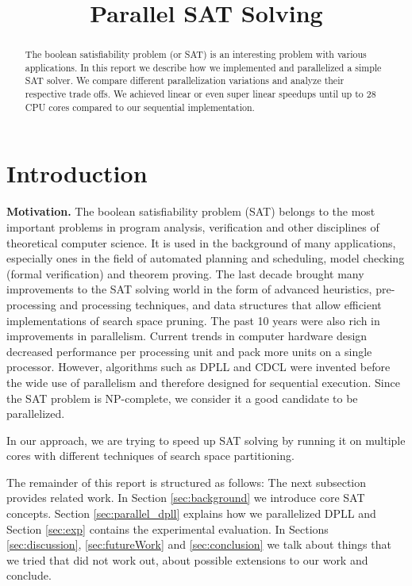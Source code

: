 \documentclass[letterpaper]{article}
\title{Parallel SAT Solving}
\newcommand{\mypar}[1]{{\bf #1.}}
\begin{document}
%
\maketitle
%

\begin{abstract}
The boolean satisfiability problem (or SAT) is an interesting problem with various applications.
In this report we describe how we implemented and parallelized a simple SAT solver.
We compare different parallelization variations and analyze their respective trade offs.
We achieved linear or even super linear speedups until up to 28 CPU cores compared to our sequential implementation.
\end{abstract}

\section{Introduction}\label{sec:intro}

\mypar{Motivation}
The boolean satisfiability problem (SAT) belongs to the most important problems in program analysis, verification and other disciplines of theoretical computer science.
It is used in the background of many applications, especially ones in the field of automated planning and scheduling, model checking (formal verification) and theorem proving.
The last decade brought many improvements to the SAT solving world in the form of advanced heuristics, pre-processing and processing techniques, and data structures that allow efficient implementations of search space pruning.
The past 10 years were also rich in improvements in parallelism.
Current trends in computer hardware design decreased performance per processing unit and pack more units on a single processor.
However, algorithms such as DPLL and CDCL were invented before the wide use of parallelism and therefore designed for sequential execution.
Since the SAT problem is NP-complete, we consider it a good candidate to be parallelized.

In our approach, we are trying to speed up SAT solving by running it on multiple cores with different techniques of search space partitioning.

The remainder of this report is structured as follows:
The next subsection provides related work.
In Section \ref{sec:background} we introduce core SAT concepts.
Section \ref{sec:parallel_dpll} explains how we parallelized DPLL and Section \ref{sec:exp} contains the experimental evaluation.
In Sections \ref{sec:discussion}, \ref{sec:futureWork} and \ref{sec:conclusion} we talk about things that we tried that did not work out, about possible extensions to our work and conclude.
\end{document}
